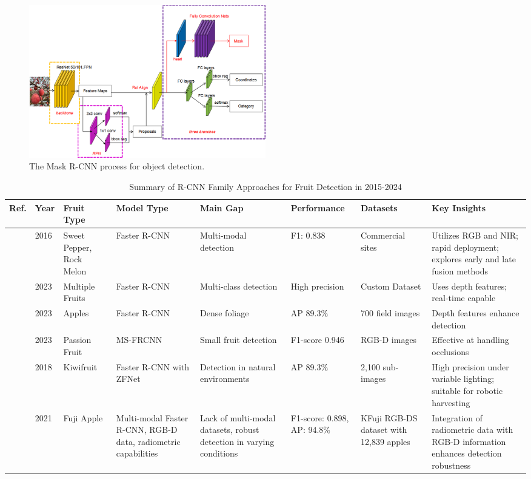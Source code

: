 \documentclass[a4paper,fleqn]{cas-dc}
\begin{document}
\begin{figure}[hbtp]
\centering
\includegraphics[width=0.5\textwidth]{fig_maskRcnn.png}
\caption{The Mask R-CNN process for object detection.}
\label{fig:mask_rcnn}
\end{figure}

\begin{table}[htbp]
	\centering
	\footnotesize 
	\caption{Summary of R-CNN Family Approaches for Fruit Detection in 2015-2024} 
	\label{tab:RCNN-based} 
	\begin{tabular}{@{}p{0.4cm}p{0.4cm}p{1.4cm}p{1.8cm}p{2cm}p{1.8cm}p{2cm}p{4.3cm}@{}}
	\toprule
	\textbf{Ref.} & \textbf{Year} & \textbf{Fruit Type} & \textbf{Model Type} & \textbf{Main Gap} & \textbf{Performance} & \textbf{Datasets} & \textbf{Key Insights} \\ \midrule
\cite{sa2016deepfruits} & 2016 & Sweet Pepper, Rock Melon & Faster R-CNN & Multi-modal detection & F1: 0.838 & Commercial sites & Utilizes RGB and NIR; rapid deployment; explores early and late fusion methods \\ \midrule
\cite{wan2020faster} & 2023 & Multiple Fruits & Faster R-CNN & Multi-class detection & High precision & Custom Dataset & Uses depth features; real-time capable \\ \midrule
\cite{fu2020faster} & 2023 & Apples & Faster R-CNN & Dense foliage & AP 89.3\% & 700 field images & Depth features enhance detection \\ \midrule
\cite{tu2020passion} & 2023 & Passion Fruit & MS-FRCNN & Small fruit detection & F1-score 0.946 & RGB-D images & Effective at handling occlusions \\ \midrule
\cite{fu2018kiwifruit} & 2018 & Kiwifruit & Faster R-CNN with ZFNet & Detection in natural environments & AP 89.3\% & 2,100 sub-images & High precision under variable lighting; suitable for robotic harvesting \\ \midrule
\cite{gene2019multi}& 2021 & Fuji Apple & Multi-modal Faster R-CNN, RGB-D data, radiometric capabilities & Lack of multi-modal datasets, robust detection in varying conditions & F1-score: 0.898, AP: 94.8\% & KFuji RGB-DS dataset with 12,839 apples & Integration of radiometric data with RGB-D information enhances detection robustness \\ \midrule

\end{tabular}
\end{table}
\end{document}
